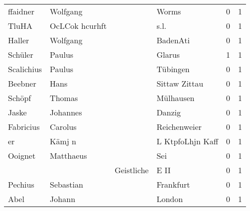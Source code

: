 \begin{center}
\begin{tiny}
\begin{longtabu}{llllrr}
                 ffaidner &                           Wolfgang &             &                                       Worms &          0 &         1 \\
                    TluHA &                     OcLCok hcurhft &             &                                        s.l. &          0 &         1 \\
                   Haller &                           Wolfgang &             &                                    BadenAti &          0 &         1 \\
                  Schüler &                             Paulus &             &                                      Glarus &          1 &         1 \\
               Scalichius &                             Paulus &             &                                    Tübingen &          0 &         1 \\
                  Beebner &                               Hans &             &                               Sittaw Zittau &          0 &         1 \\
                   Schöpf &                             Thomas &             &                                   Mülhausen &          0 &         1 \\
                    Jaske &                           Johannes &             &                                      Danzig &          0 &         1 \\
                Fabricius &                            Carolus &             &                                Reichenweier &          0 &         1 \\
                       er &                             Kämj n &             &                            L KtpfoLhjn Kaff &          0 &         1 \\
                  Ooignet &                          Matthaeus &             &                                         Sei &          0 &         1 \\
                          &                                    &  Geistliche &                                        E II &          0 &         1 \\
                  Pechius &                          Sebastian &             &                                   Frankfurt &          0 &         1 \\
                     Abel &                             Johann &             &                                      London &          0 &         1 \\

\end{longtabu}
\end{tiny}
\end{center}
